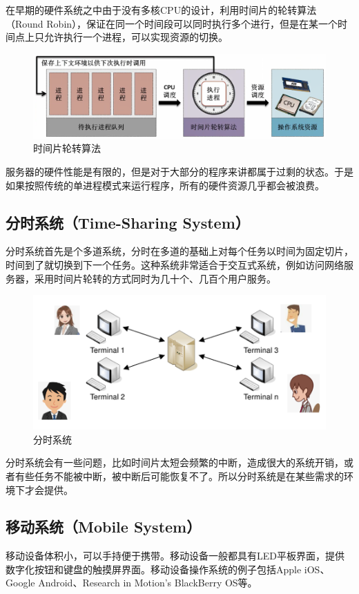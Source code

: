在早期的硬件系统之中由于没有多核CPU的设计，利用时间片的轮转算法（Round Robin），保证在同一个时间段可以同时执行多个进行，但是在某一个时间点上只允许执行一个进程，可以实现资源的切换。

\begin{figure}[H]
	\centering
	\includegraphics[scale=0.6]{img/C1/1-6/5.png}
	\caption{时间片轮转算法}
\end{figure}

服务器的硬件性能是有限的，但是对于大部分的程序来讲都属于过剩的状态。于是如果按照传统的单进程模式来运行程序，所有的硬件资源几乎都会被浪费。

\subsection{分时系统（Time-Sharing System）}

分时系统首先是个多道系统，分时在多道的基础上对每个任务以时间为固定切片，时间到了就切换到下一个任务。这种系统非常适合于交互式系统，例如访问网络服务器，采用时间片轮转的方式同时为几十个、几百个用户服务。

\begin{figure}[H]
	\centering
	\includegraphics[scale=0.55]{img/C1/1-6/6.png}
	\caption{分时系统}
\end{figure}

分时系统会有一些问题，比如时间片太短会频繁的中断，造成很大的系统开销，或者有些任务不能被中断，被中断后可能恢复不了。所以分时系统是在某些需求的环境下才会提供。

\subsection{移动系统（Mobile System）}

移动设备体积小，可以手持便于携带。移动设备一般都具有LED平板界面，提供数字化按钮和键盘的触摸屏界面。移动设备操作系统的例子包括Apple iOS、Google Android、Research in Motion's BlackBerry OS等。

\newpage
